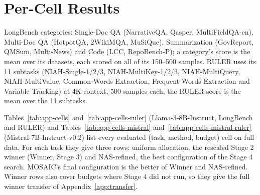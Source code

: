 \clearpage
\appendix
\makeatletter
\setlength{\@fptop}{0pt}\setlength{\@fpsep}{14pt}\setlength{\@fpbot}{0pt plus 1fil}
\setlength{\@dblfptop}{0pt}\setlength{\@dblfpsep}{14pt}\setlength{\@dblfpbot}{0pt plus 1fil}
\makeatother
\renewcommand{\topfraction}{0.97}\renewcommand{\bottomfraction}{0.9}\renewcommand{\textfraction}{0.03}
\renewcommand{\floatpagefraction}{0.85}\renewcommand{\dbltopfraction}{0.97}\renewcommand{\dblfloatpagefraction}{0.85}
\setcounter{topnumber}{4}\setcounter{dbltopnumber}{3}\setcounter{totalnumber}{6}

\section{Per-Cell Results}
\label{app:cells}


LongBench categories: Single-Doc QA (NarrativeQA, Qasper, MultiFieldQA-en), Multi-Doc QA (HotpotQA, 2WikiMQA, MuSiQue), Summarization (GovReport, QMSum, Multi-News) and Code (LCC, RepoBench-P); a category's score is the mean over its datasets, each scored on all of its 150--500 samples. RULER uses its 11 subtasks (NIAH-Single-1/2/3, NIAH-MultiKey-1/2/3, NIAH-MultiQuery, NIAH-MultiValue, Common-Words Extraction, Frequent-Words Extraction and Variable Tracking) at 4K context, 500 samples each; the RULER score is the mean over the 11 subtasks.

Tables~\ref{tab:app-cells} and~\ref{tab:app-cells-ruler} (Llama-3-8B-Instruct, LongBench and RULER) and Tables~\ref{tab:app-cells-mistral} and~\ref{tab:app-cells-mistral-ruler} (Mistral-7B-Instruct-v0.2) list every evaluated (task, method, budget) cell on full data. For each task they give three rows: uniform allocation, the rescaled Stage 2 winner (Winner, Stage 3) and NAS-refined, the best configuration of the Stage 4 search. MOSAIC's final configuration is the better of Winner and NAS-refined. Winner rows also cover budgets where Stage 4 did not run, so they give the full winner transfer of Appendix~\ref{app:transfer}.


